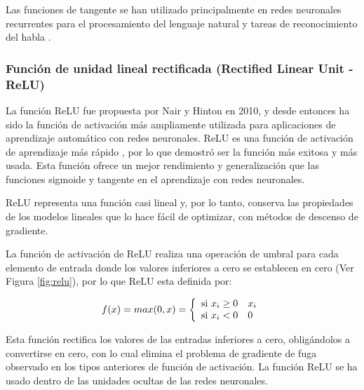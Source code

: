 \vspace{5mm} %

Las funciones de tangente se han utilizado principalmente en redes neuronales recurrentes para el procesamiento del lenguaje natural \cite{43} y tareas de reconocimiento del habla \cite{44}.
    
\subsubsection{Funci\'{o}n de unidad lineal rectificada (Rectified Linear Unit - ReLU)}

La funci\'{o}n ReLU fue propuesta por Nair y Hinton en 2010, y desde entonces ha sido la funci\'{o}n de activaci\'{o}n m\'{a}s ampliamente utilizada para aplicaciones de aprendizaje autom\'{a}tico con redes neuronales. ReLU es una funci\'{o}n de activaci\'{o}n de aprendizaje m\'{a}s r\'{a}pido \cite{46}, por lo que demostr\'{o} ser la funci\'{o}n m\'{a}s exitosa y m\'{a}s usada. Esta funci\'{o}n ofrece un mejor rendimiento y generalizaci\'{o}n que las funciones sigmoide y tangente en el aprendizaje con redes neuronales.

\vspace{5mm} %

ReLU representa una función casi lineal y, por lo tanto, conserva las propiedades de los modelos lineales que lo hace fácil de optimizar, con métodos de descenso de gradiente.

\vspace{5mm} %

La función de activación de ReLU realiza una operación de umbral para cada elemento de entrada donde los valores inferiores a cero se establecen en cero (Ver Figura \ref{fig:relu}), por lo que ReLU esta definida por:

\begin{equation}
f(x) = max(0,x) = \left\lbrace
\begin{array}{ll}
\textup{si } x_{i}\geq0 & x_{i}\\
\textup{si } x_{i} < 0 & 0
\end{array}
\right.
\end{equation}

Esta función rectifica los valores de las entradas inferiores a cero, obligándolos a convertirse en cero, con lo cual elimina el problema de gradiente de fuga observado en los tipos anteriores de función de activación. La función ReLU se ha usado dentro de las unidades ocultas de las redes neuronales.

